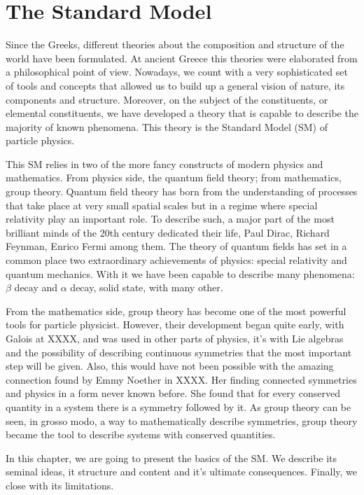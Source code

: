 \chapter[The Standard Model]{The Standard Model}
\label{chap:SM}
Since the Greeks, different theories about the composition and structure of the world have been formulated. At ancient Greece this theories were elaborated from a philosophical point of view. Nowadays, we count with a very sophisticated  set of tools and concepts that allowed us to build up a general vision of nature, its components and structure. Moreover, on the subject of the constituents, or elemental constituents, we have developed a theory that is capable to describe the majority of known phenomena. This theory is the Standard Model (SM) of particle physics. 

This SM relies in two of the more fancy constructs of modern physics and mathematics. From physics side, the quantum field theory; from mathematics, group theory. Quantum field theory has born from the understanding of processes that take place at very small spatial scales but in a regime where special relativity play an important role. To describe such, a major part of the most brilliant minds of the 20th century dedicated their life, Paul Dirac, Richard Feynman, Enrico Fermi among them. The theory of quantum fields has set in a common place two extraordinary achievements of physics: special relativity and quantum mechanics. With it we have been capable to describe many phenomena: $\beta$ decay and $\alpha$ decay, solid state, with many other.

From the mathematics side, group theory has become one of the most powerful tools for particle physicist. However, their development began quite early, with Galois at XXXX, and was used in other parts of physics, it's with Lie algebras and the possibility of describing continuous symmetries that the most important step will be given. Also, this would have not been possible with the amazing connection found by Emmy Noether in XXXX. Her finding connected symmetries and physics in a form never known before. She found that for every conserved quantity in a system there is a symmetry followed by it. As group theory can be seen, in grosso modo, a way to mathematically describe symmetries, group theory became the tool to describe systems with conserved quantities. 

In this chapter, we are going to present the basics of the SM. We describe its seminal ideas, it structure and content and it's ultimate consequences. Finally, we close with its limitations.

